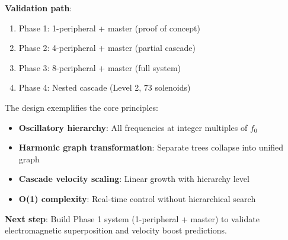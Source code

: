 \documentclass[12pt,a4paper]{article}
\begin{document}
\textbf{Validation path}:
\begin{enumerate}
\item Phase 1: 1-peripheral + master (proof of concept)
\item Phase 2: 4-peripheral + master (partial cascade)
\item Phase 3: 8-peripheral + master (full system)
\item Phase 4: Nested cascade (Level 2, 73 solenoids)
\end{enumerate}

The design exemplifies the core principles:
\begin{itemize}
\item \textbf{Oscillatory hierarchy}: All frequencies at integer multiples of $f_0$
\item \textbf{Harmonic graph transformation}: Separate trees collapse into unified graph
\item \textbf{Cascade velocity scaling}: Linear growth with hierarchy level
\item \textbf{O(1) complexity}: Real-time control without hierarchical search
\end{itemize}

\textbf{Next step}: Build Phase 1 system (1-peripheral + master) to validate electromagnetic superposition and velocity boost predictions.
\end{document}
